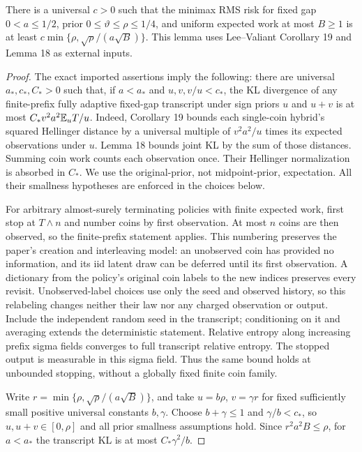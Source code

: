 \begin{lemma}\label{above:lem:fixedlower}
There is a universal $c>0$ such that the minimax RMS risk for fixed gap
$0<a\le1/2$, prior $0\le\vartheta\le\rho\le1/4$, and uniform expected
work at most $B\ge1$ is at least
$c\min\{\rho,\sqrt\rho/(a\sqrt B)\}$.
This lemma uses Lee--Valiant Corollary 19 and Lemma 18 as external inputs.
\end{lemma}
\begin{proof}
The exact imported assertions imply the following: there are universal
$a_*,c_*,C_*>0$ such that, if $a<a_*$ and $u,v,v/u<c_*$, the KL divergence
of any finite-prefix fully adaptive fixed-gap transcript under sign priors
$u$ and $u+v$ is at most $C_*v^2a^2\mathbb E_u T/u$.
Indeed, Corollary 19 bounds each single-coin hybrid's squared Hellinger
distance by a universal multiple of $v^2a^2/u$ times its expected observations
under $u$. Lemma 18 bounds joint KL by the sum of those distances. Summing
coin work counts each observation once. Their Hellinger normalization is
absorbed in $C_*$. We use the original-prior, not midpoint-prior, expectation.
All their smallness hypotheses are enforced in the choices below.

For arbitrary almost-surely terminating policies with finite expected work,
first stop at $T\wedge n$ and number coins by first observation. At most $n$
coins are then observed, so the finite-prefix statement applies. This numbering
preserves the paper's creation and interleaving model: an unobserved coin has
provided no information, and its iid latent draw can be deferred until its first
observation. A dictionary from the policy's original coin labels to the new
indices preserves every revisit. Unobserved-label choices use only the seed
and observed history, so this relabeling changes neither their law nor any
charged observation or output. Include the
independent random seed in the transcript; conditioning on it and averaging
extends the deterministic statement. Relative entropy along increasing prefix
sigma fields converges to full transcript relative entropy. The stopped output
is measurable in this sigma field. Thus the same bound holds at unbounded
stopping, without a globally fixed finite coin family.

Write $r=\min\{\rho,\sqrt\rho/(a\sqrt B)\}$, and take
$u=b\rho$, $v=\gamma r$ for fixed sufficiently small positive universal
constants $b,\gamma$. Choose $b+\gamma\le1$ and $\gamma/b<c_*$,
so $u,u+v\in[0,\rho]$ and all prior smallness assumptions hold.
Since $r^2a^2B\le\rho$, for $a<a_*$ the transcript KL is at most
$C_*\gamma^2/b$.


\end{proof}
